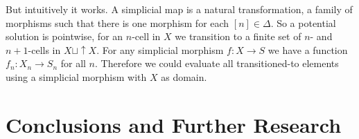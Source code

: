 \documentclass[12pt]{article}
\theoremstyle{definition}
\newcommand{\1}{\mathbbm{1}}
\begin{document}
But intuitively it works. A simplicial map is a natural transformation, a family of morphisms such that there is one morphism for each $[n]\in \Delta$. So a potential solution is pointwise, for an $n$-cell in $X$ we transition to a finite set of $n$- and $n+1$-cells in $X\sqcup \uparrow X$. For any simplicial morphism $f: X\to S$ we have a function $f_n: X_n\to S_n$ for all $n$. Therefore we could evaluate all transitioned-to elements using a simplicial morphism with $X$ as domain.
\newpage

\section{Conclusions and Further Research}



\end{document}
